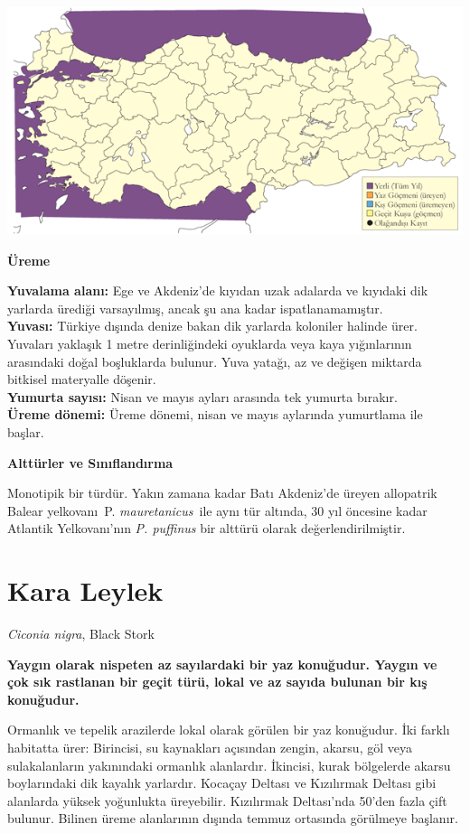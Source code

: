 \documentclass[
  a4paper,
  DIV=11,
  numbers=noendperiod]{scrreprt}
\begin{document}
\includegraphics{images/harita_Page_049.png}

\textbf{Üreme}

\textbf{Yuvalama alanı:} Ege ve Akdeniz'de kıyıdan uzak adalarda ve
kıyıdaki dik yarlarda ürediği varsayılmış, ancak şu ana kadar
ispatlanamamıştır.\\
\textbf{Yuvası:} Türkiye dışında denize bakan dik yarlarda koloniler
halinde ürer. Yuvaları yaklaşık 1 metre derinliğindeki oyuklarda veya
kaya yığınlarının arasındaki doğal boşluklarda bulunur. Yuva yatağı, az
ve değişen miktarda bitkisel materyalle döşenir.\\
\textbf{Yumurta sayısı:} Nisan ve mayıs ayları arasında tek yumurta
bırakır.\\
\textbf{Üreme dönemi:} Üreme dönemi, nisan ve mayıs aylarında yumurtlama
ile başlar.

\textbf{Alttürler ve Sınıflandırma}

Monotipik bir türdür. Yakın zamana kadar Batı Akdeniz'de üreyen
allopatrik Balear yelkovanı~P. \emph{mauretanicus}~ile aynı tür altında,
30 yıl öncesine kadar Atlantik Yelkovanı'nın \emph{P. puffinus} bir
alttürü olarak değerlendirilmiştir.

\section{Kara Leylek}\label{kara-leylek}

\emph{Ciconia nigra}, Black Stork

\textbf{Yaygın olarak nispeten az sayılardaki bir yaz konuğudur. Yaygın
ve çok sık rastlanan bir geçit türü, lokal ve az sayıda bulunan bir kış
konuğudur.}

Ormanlık ve tepelik arazilerde lokal olarak görülen bir yaz konuğudur.
İki farklı habitatta ürer: Birincisi, su kaynakları açısından zengin,
akarsu, göl veya sulakalanların yakınındaki ormanlık alanlardır.
İkincisi, kurak bölgelerde akarsu boylarındaki dik kayalık yarlardır.
Kocaçay Deltası ve Kızılırmak Deltası gibi alanlarda yüksek yoğunlukta
üreyebilir. Kızılırmak Deltası'nda 50'den fazla çift bulunur. Bilinen
üreme alanlarının dışında temmuz ortasında görülmeye başlanır.
\end{document}
